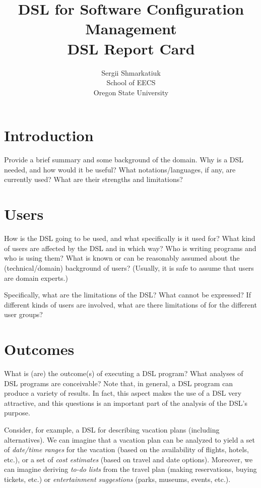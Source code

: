 \documentclass[11pt]{article}
\begin{document}
\title{\textbf{DSL for Software Configuration Management}
\\ DSL Report Card}

\author{Sergii Shmarkatiuk \\
School of EECS \\ 
Oregon State University
}

\maketitle


\section{Introduction}
\label{sec:intro}

Provide a brief summary and some background of the domain. Why is a DSL
needed, and how would it be useful?  What notations/languages, if any, are
currently used? What are their strengths and limitations?


\section{Users}
\label{sec:users}

How is the DSL going to be used, and what specifically is it used for?  
% 
What kind of users are affected by the DSL and in which way? Who is writing
programs and who is using them? What is known or can be reasonably assumed
about the (technical/domain) background of users? (Usually, it is safe to
assume that users are domain experts.)

Specifically, what are the limitations of the DSL? What cannot be expressed?
If different kinds of users are involved, what are there limitations of for
the different user groups?



\section{Outcomes}
\label{sec:outcomes}

What is (are) the outcome(s) of executing a DSL program? What analyses of DSL
programs are conceivable?  Note that, in general, a DSL program can produce a
variety of results. In fact, this aspect makes the use of a DSL very attractive, and this
questions is an important part of the analysis of the DSL's purpose.

Consider, for example, a DSL for describing vacation plans (including
alternatives).  We can imagine that a vacation plan can be analyzed to yield a
set of \emph{date/time ranges} for the vacation (based on the availability of
flights, hotels, etc.), or a set of \emph{cost estimates} (based on travel and
date options). Moreover, we can imagine deriving \emph{to-do lists} from the
travel plan (making reservations, buying tickets, etc.) or \emph{entertainment
suggestions} (parks, museums, events, etc.). 
\end{document}
